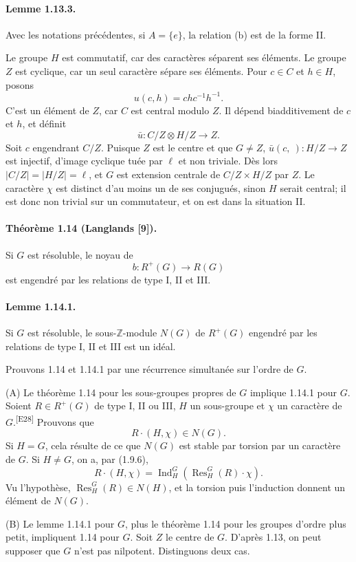 \documentclass[10pt,letterpaper]{article}
\newcommand{\Z}{\mathbb Z}
\newcommand{\Ind}{\operatorname{Ind}}
\newcommand{\Res}{\operatorname{Res}}
\providecommand{\Ind}{\operatorname{Ind}}
\newcommand{\auditmark}[1]{\textsuperscript{\normalfont\scriptsize[E#1]}}
\begin{document}
\paragraph{Lemme 1.13.3.} Avec les notations précédentes, si \(A=\{e\}\), la relation (b) est de la forme II.

Le groupe \(H\) est commutatif, car des caractères séparent ses éléments. Le groupe \(Z\) est cyclique, car un seul caractère sépare ses éléments. Pour \(c\in C\) et \(h\in H\), posons
\[
u(c,h)=chc^{-1}h^{-1}.
\]
C'est un élément de \(Z\), car \(C\) est central modulo \(Z\). Il dépend biadditivement de \(c\) et \(h\), et définit
\[
\bar u:C/Z\otimes H/Z\longrightarrow Z.
\]
Soit \(c\) engendrant \(C/Z\). Puisque \(Z\) est le centre et que \(G\ne Z\), \(\bar u(c,\ ) :H/Z\to Z\) est injectif, d'image cyclique tuée par \(\ell\) et non triviale. Dès lors \(|C/Z|=|H/Z|=\ell\), et \(G\) est extension centrale de \(C/Z\times H/Z\) par \(Z\). Le caractère \(\chi\) est distinct d'au moins un de ses conjugués, sinon \(H\) serait central; il est donc non trivial sur un commutateur, et on est dans la situation II.

\paragraph{Théorème 1.14 (Langlands [9]).} Si \(G\) est résoluble, le noyau de
\[
b:R^+(G)\longrightarrow R(G)
\]
est engendré par les relations de type I, II et III.

\paragraph{Lemme 1.14.1.} Si \(G\) est résoluble, le sous-\(\Z\)-module \(N(G)\) de \(R^+(G)\) engendré par les relations de type I, II et III est un idéal.

Prouvons 1.14 et 1.14.1 par une récurrence simultanée sur l'ordre de \(G\).

(A) Le théorème 1.14 pour les sous-groupes propres de \(G\) implique 1.14.1 pour \(G\). Soient \(R\in R^+(G)\) de type I, II ou III, \(H\) un sous-groupe et \(\chi\) un caractère de \(G\).\auditmark{28} Prouvons que
\[
R\cdot(H,\chi)\in N(G).
\]
Si \(H=G\), cela résulte de ce que \(N(G)\) est stable par torsion par un caractère de \(G\). Si \(H\ne G\), on a, par (1.9.6),
\[
R\cdot(H,\chi)=\Ind_H^G(\Res_H^G(R)\cdot\chi).
\]
Vu l'hypothèse, \(\Res_H^G(R)\in N(H)\), et la torsion puis l'induction donnent un élément de \(N(G)\).

(B) Le lemme 1.14.1 pour \(G\), plus le théorème 1.14 pour les groupes d'ordre plus petit, impliquent 1.14 pour \(G\). Soit \(Z\) le centre de \(G\). D'après 1.13, on peut supposer que \(G\) n'est pas nilpotent. Distinguons deux cas.
\end{document}

